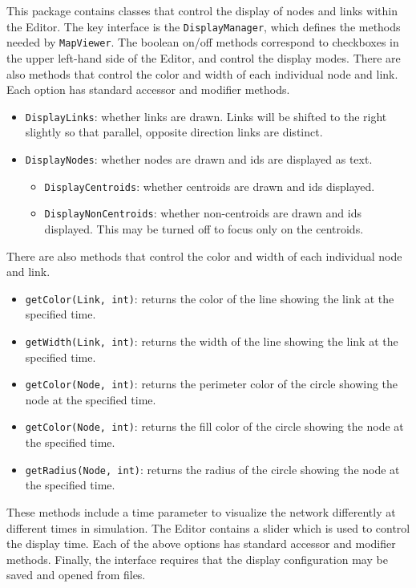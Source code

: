 This package contains classes that control the display of nodes and links within the Editor. The key interface is the \texttt{DisplayManager}, which defines the methods needed by \texttt{MapViewer}. The boolean on/off methods correspond to checkboxes in the upper left-hand side of the Editor, and control the display modes. There are also methods that control the color and width of each individual node and link. Each option has standard accessor and modifier methods.
%
\begin{itemize}
	\item \texttt{DisplayLinks}: whether links are drawn. Links will be shifted to the right slightly so that parallel, opposite direction links are distinct.
	
	\item \texttt{DisplayNodes}: whether nodes are drawn and ids are displayed as text.
	
	\begin{itemize}
		\item \texttt{DisplayCentroids}: whether centroids are drawn and ids displayed.
		\item \texttt{DisplayNonCentroids}: whether non-centroids are drawn and ids displayed. This may be turned off to focus only on the centroids.
	\end{itemize}
\end{itemize}
There are also methods that control the color and width of each individual node and link. 
\begin{itemize}
	\item \texttt{getColor(Link, int)}: returns the color of the line showing the link at the specified time.
	\item \texttt{getWidth(Link, int)}: returns the width of the line showing the link at the specified time.
	\\
	\item \texttt{getColor(Node, int)}: returns the perimeter color of the circle showing the node at the specified time.
	\item \texttt{getColor(Node, int)}: returns the fill color of the circle showing the node at the specified time.
	\item \texttt{getRadius(Node, int)}: returns the radius of the circle showing the node at the specified time.
\end{itemize}
These methods include a time parameter to visualize the network differently at different times in simulation. The Editor contains a slider which is used to control the display time.
Each of the above options has standard accessor and modifier methods.
%
Finally, the interface requires that the display configuration may be saved and opened from files.

